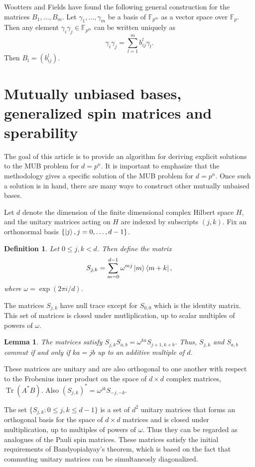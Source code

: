 \documentclass[a4paper]{article}
\DeclareMathOperator{\Tr}{Tr}
\newtheorem{definition}{Definition}
\newtheorem{lemma}{Lemma}
\begin{document}
  Wootters and Fields have found the following general
  construction for the matrices $B_1,\ldots,B_m$. Let
  $\gamma_1,\ldots,\gamma_m$ be a basis of
  $\mathbb{F}_{p^{m}}$ as a vector space over
  $\mathbb{F}_p$. Then any element $\gamma_i \gamma_j \in
  \mathbb{F}_{p^{m}}$ can be written uniquely as
  \[
    \gamma_i \gamma_j
    = \sum_{l=1}^{m} b_{ij}^{l} \gamma_l.
  \] 
  Then $B_l = \left( b_{ij}^{l} \right)$.

  \section{Mutually unbiased bases, generalized spin
  matrices and sperability}

  The goal of this article is to provide an algorithm for
  deriving explicit solutions to the MUB problem for $d =
  p^{n}$. It is important to emphasize that the methodology
  gives a specific solution of the MUB problem for $d =
  p^{n}$. Once such a solution is in hand, there are many
  ways to construct other mutually unbaised bases.

  Let $d$ denote the dimension of the finite dimensional
  complex Hilbert space $H$, and the unitary matrices acting
  on $H$ are indexed by subscripts $(j,k)$. Fix an
  orthonormal basis $\{\ket j, j = 0,\ldots,d-1\}$.

  \begin{definition}
    Let $0 \leq j,k < d$. Then define the matrix
    \[
      S_{j,k}
      = \sum_{m=0}^{d-1} \omega^{mj} \ket m \bra{m+k},
    \] 
    where $\omega = \exp(2\pi i / d)$.
  \end{definition}
  The matrices $S_{j,k}$ have null trace except for
  $S_{0,0}$ which is the identity matrix. This set of
  matrices is closed under mutliplication, up to scalar
  multiples of powers of $\omega$.

  \begin{lemma}
    The matrices satisfy $S_{j,k} S_{a,b} = \omega^{ka}
    S_{j+1,k+b}$. Thus, $S_{j,k}$ and $S_{a,b}$ commut if
    and only if $ka = jb$ up to an additive multiple of $d$.
  \end{lemma}

  These matrices are unitary and are also orthogonal to one
  another with respect to the Frobenius inner product on the
  space of $d \times d$ complex matrices, $\Tr(A^{*}B)$.
  Also $(S_{j,k})^{*} = \omega^{jk} S_{-j,-k}$.

  The set $\{S_{j,k} : 0 \leq j,k \leq d - 1\}$ is a set of
  $d^2$ unitary matrices that forms an orthogonal basis for
  the space of $d \times d$ matrices and is closed under
  multiplication, up to multiples of powers of $\omega$.
  Thus they can be regarded as analogues of the Pauli spin
  matrices. These matrices satisfy the initial requirements
  of Bandyopiahyay's theorem, which is based on the fact
  that commuting unitary matrices can be simultaneosly
  diagonalized.
\end{document}
